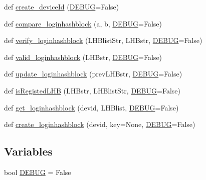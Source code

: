 \begin{DoxyCompactItemize}
\item 
def \hyperlink{namespaceloginhashblock_a1bd31fe2f0ea4e6673127d72b6c42826}{create\+\_\+device\+Id} (\hyperlink{namespaceloginhashblock_ad198a2ffc3d7bab32167aed00d2f5c65}{D\+E\+B\+UG}=False)
\item 
def \hyperlink{namespaceloginhashblock_ac24dd842eb90e0ede55e842d44148d5b}{compare\+\_\+loginhashblock} (a, b, \hyperlink{namespaceloginhashblock_ad198a2ffc3d7bab32167aed00d2f5c65}{D\+E\+B\+UG}=False)
\item 
def \hyperlink{namespaceloginhashblock_aa5bb94484a68d0bbebce23b4cfeeb4b7}{verify\+\_\+loginhashblock} (L\+H\+Blist\+Str, L\+H\+Bstr, \hyperlink{namespaceloginhashblock_ad198a2ffc3d7bab32167aed00d2f5c65}{D\+E\+B\+UG}=False)
\item 
def \hyperlink{namespaceloginhashblock_adb424539d851426da7b65d53c5a6d577}{valid\+\_\+loginhashblock} (L\+H\+Bstr, \hyperlink{namespaceloginhashblock_ad198a2ffc3d7bab32167aed00d2f5c65}{D\+E\+B\+UG}=False)
\item 
def \hyperlink{namespaceloginhashblock_afef75d97c834ce0fda711b93d0b56b00}{update\+\_\+loginhashblock} (prev\+L\+H\+Bstr, \hyperlink{namespaceloginhashblock_ad198a2ffc3d7bab32167aed00d2f5c65}{D\+E\+B\+UG}=False)
\item 
def \hyperlink{namespaceloginhashblock_a746d5c48cd93a76b78c90c34419ebdaa}{is\+Registed\+L\+HB} (L\+H\+Bstr, L\+H\+Blist\+Str, \hyperlink{namespaceloginhashblock_ad198a2ffc3d7bab32167aed00d2f5c65}{D\+E\+B\+UG}=False)
\item 
def \hyperlink{namespaceloginhashblock_a6187961cb9009c7836e7e6e639085f93}{get\+\_\+loginhashblock} (devid, L\+H\+Blist, \hyperlink{namespaceloginhashblock_ad198a2ffc3d7bab32167aed00d2f5c65}{D\+E\+B\+UG}=False)
\item 
def \hyperlink{namespaceloginhashblock_ad3ef8dab740c69ca8424797f9c146a53}{create\+\_\+loginhashblock} (devid, key=None, \hyperlink{namespaceloginhashblock_ad198a2ffc3d7bab32167aed00d2f5c65}{D\+E\+B\+UG}=False)
\end{DoxyCompactItemize}
\subsection*{Variables}
\begin{DoxyCompactItemize}
\item 
bool \hyperlink{namespaceloginhashblock_ad198a2ffc3d7bab32167aed00d2f5c65}{D\+E\+B\+UG} = False
\end{DoxyCompactItemize}


